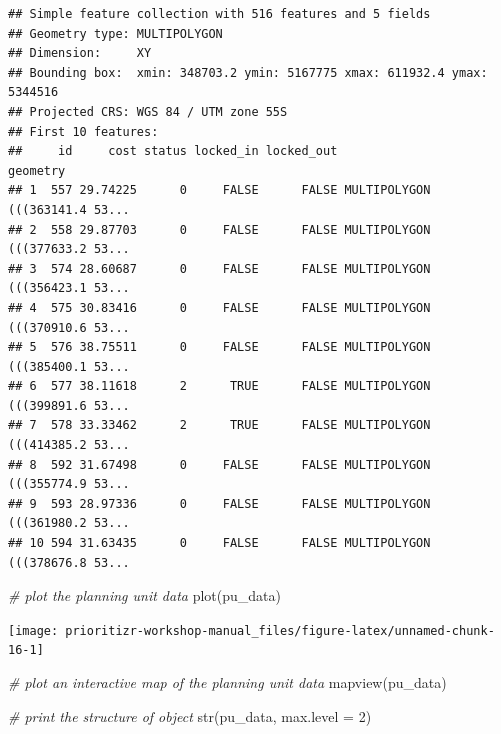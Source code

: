 \documentclass[
  12pt,
]{book}
\newenvironment{Shaded}{\begin{snugshade}}{\end{snugshade}}
\newcommand{\AttributeTok}[1]{\textcolor[rgb]{0.77,0.63,0.00}{#1}}
\newcommand{\CommentTok}[1]{\textcolor[rgb]{0.56,0.35,0.01}{\textit{#1}}}
\newcommand{\DecValTok}[1]{\textcolor[rgb]{0.00,0.00,0.81}{#1}}
\newcommand{\FunctionTok}[1]{\textcolor[rgb]{0.00,0.00,0.00}{#1}}
\newcommand{\NormalTok}[1]{#1}
\begin{document}
\begin{verbatim}
## Simple feature collection with 516 features and 5 fields
## Geometry type: MULTIPOLYGON
## Dimension:     XY
## Bounding box:  xmin: 348703.2 ymin: 5167775 xmax: 611932.4 ymax: 5344516
## Projected CRS: WGS 84 / UTM zone 55S
## First 10 features:
##     id     cost status locked_in locked_out                       geometry
## 1  557 29.74225      0     FALSE      FALSE MULTIPOLYGON (((363141.4 53...
## 2  558 29.87703      0     FALSE      FALSE MULTIPOLYGON (((377633.2 53...
## 3  574 28.60687      0     FALSE      FALSE MULTIPOLYGON (((356423.1 53...
## 4  575 30.83416      0     FALSE      FALSE MULTIPOLYGON (((370910.6 53...
## 5  576 38.75511      0     FALSE      FALSE MULTIPOLYGON (((385400.1 53...
## 6  577 38.11618      2      TRUE      FALSE MULTIPOLYGON (((399891.6 53...
## 7  578 33.33462      2      TRUE      FALSE MULTIPOLYGON (((414385.2 53...
## 8  592 31.67498      0     FALSE      FALSE MULTIPOLYGON (((355774.9 53...
## 9  593 28.97336      0     FALSE      FALSE MULTIPOLYGON (((361980.2 53...
## 10 594 31.63435      0     FALSE      FALSE MULTIPOLYGON (((378676.8 53...
\end{verbatim}

\begin{Shaded}
\begin{Highlighting}[]
\CommentTok{\# plot the planning unit data}
\FunctionTok{plot}\NormalTok{(pu\_data)}
\end{Highlighting}
\end{Shaded}

\begin{center}\texttt{[image: prioritizr-workshop-manual\_files/figure-latex/unnamed-chunk-16-1]} \end{center}

\begin{Shaded}
\begin{Highlighting}[]
\CommentTok{\# plot an interactive map of the planning unit data}
\FunctionTok{mapview}\NormalTok{(pu\_data)}
\end{Highlighting}
\end{Shaded}

\begin{Shaded}
\begin{Highlighting}[]
\CommentTok{\# print the structure of object}
\FunctionTok{str}\NormalTok{(pu\_data, }\AttributeTok{max.level =} \DecValTok{2}\NormalTok{)}
\end{Highlighting}
\end{Shaded}
\end{document}
